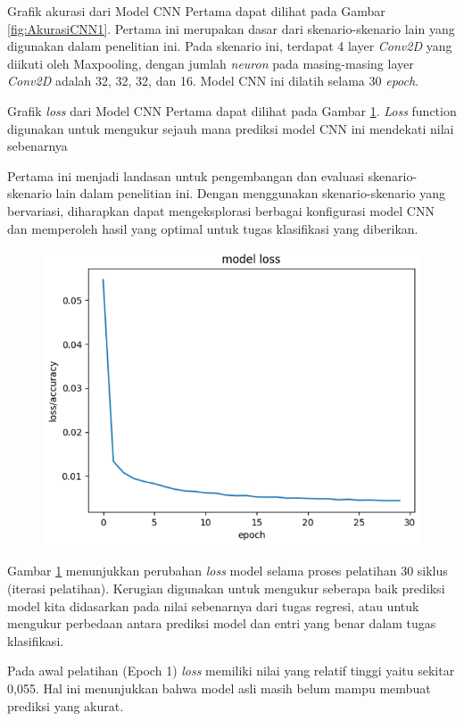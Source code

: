 Grafik akurasi dari Model CNN Pertama dapat dilihat pada Gambar \ref{fig:AkurasiCNN1}. Pertama ini merupakan dasar dari skenario-skenario lain yang digunakan dalam penelitian ini. Pada skenario ini, terdapat 4 layer \textit{Conv2D} yang diikuti oleh Maxpooling, dengan jumlah \textit{neuron} pada masing-masing layer \textit{Conv2D} adalah 32, 32, 32, dan 16. Model CNN ini dilatih selama 30\textit{ epoch}.

Grafik \textit{loss} dari Model CNN Pertama dapat dilihat pada Gambar \ref{fig:lossModelCNN1}. \textit{Loss} function digunakan untuk mengukur sejauh mana prediksi model CNN ini mendekati nilai sebenarnya

Pertama ini menjadi landasan untuk pengembangan dan evaluasi skenario-skenario lain dalam penelitian ini. Dengan menggunakan skenario-skenario yang bervariasi, diharapkan dapat mengeksplorasi berbagai konfigurasi model CNN dan memperoleh hasil yang optimal untuk tugas klasifikasi yang diberikan.

\begin{figure}[!hbt]
	\centering
	\includegraphics[width=0.7\linewidth]{gambar/bener/Loss_ModelCNN.png}
	\label{fig:lossModelCNN1}
\end{figure}
Gambar \ref{fig:lossModelCNN1}  menunjukkan perubahan \textit{loss} model selama proses pelatihan 30 siklus (iterasi pelatihan). Kerugian digunakan untuk mengukur seberapa baik prediksi model kita didasarkan pada nilai sebenarnya dari tugas regresi, atau untuk mengukur perbedaan antara prediksi model dan entri yang benar dalam tugas klasifikasi.

Pada awal pelatihan (Epoch 1) \textit{loss} memiliki nilai yang relatif tinggi yaitu sekitar 0,055. Hal ini menunjukkan bahwa model asli masih belum mampu membuat prediksi yang akurat.

